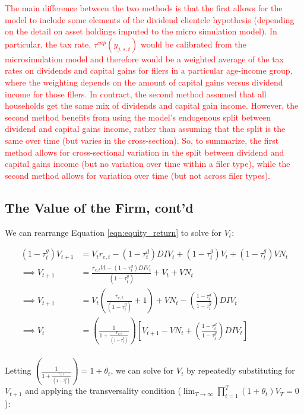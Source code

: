 \textcolor{red}{The main difference between the two methods is that the first allows for the model to include some elements of the dividend clientele hypothesis (depending on the detail on asset holdings imputed to the micro simulation model).  In particular, the tax rate, $\tau^{cap}(y_{j,s,t})$ would be calibrated from the microsimulation model and therefore would be a weighted average of the tax rates on dividends and capital gains for filers in a particular age-income group, where the weighting depends on the amount of capital gains versus dividend income for those filers.  In contract, the second method assumed that all households get the same mix of dividends and capital gain income.  However, the second method benefits from using the model's endogenous split between dividend and capital gains income, rather than assuming that the split is the same over time (but varies in the cross-section).  So, to summarize, the first method allows for cross-sectional variation in the split between dividend and capital gains income (but no variation over time within a filer type), while the second method allows for variation over time (but not across filer types).}

\subsection{The Value of the Firm, cont'd}
We can rearrange Equation \ref{eqn:equity_return} to solve for $V_{t}$:

\begin{equation}
\begin{split}
(1-\tau^{g}_{t})V_{t+1} &=V_{t}r_{e,t}-(1-\tau^{d}_{t})DIV_{t}+(1-\tau^{g}_{t})V_{t}+(1-\tau^{g}_{t})VN_{t}\\
\implies  V_{t+1} & = \frac{r_{e,t}V{t}-(1-\tau^{d}_{t})DIV_{t}}{(1-\tau^{g}_{t})}+V_{t}+VN_{t} \\
\implies  V_{t+1} & = V_{t}\left(\frac{r_{e,t}}{(1-\tau^{g}_{t})}+1\right)+VN_{t} - \left(\frac{1-\tau^{d}_{t}}{1-\tau^{g}_{t}}\right)DIV_{t} \\
\implies V_{t} &= \left(\frac{1}{1+\frac{r_{e,t}}{(1-\tau^{g}_{t})}}\right)\left[V_{t+1} - VN_{t} + \left(\frac{1-\tau^{d}_{t}}{1-\tau^{g}_{t}}\right)DIV_{t}\right]  \\
\end{split}
\end{equation}

\noindent\noindent Letting $ \left(\frac{1}{1+\frac{r_{e,t}}{(1-\tau^{g}_{t})}}\right) = 1+\theta_{t}$, we can solve for $V_{t}$ by repeatedly substituting for $V_{t+1}$ and applying the transversality condition ($\lim_{T \to \infty} \prod_{t=1}^{T}(1+\theta_{t})V_{T}=0$):

